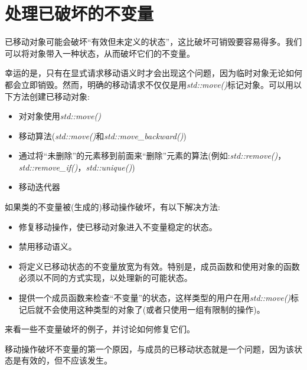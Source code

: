 \section{处理已破坏的不变量}

已移动对象可能会破坏“有效但未定义的状态”，这比破坏可销毁要容易得多。我们可以将对象带入一种状态，从而破坏它们的不变量。\par

幸运的是，只有在显式请求移动语义时才会出现这个问题，因为临时对象无论如何都会立即销毁。然而，明确的移动请求不仅仅是用\textit{std::move()}标记对象。可以用以下方法创建已移动对象:\par

\begin{itemize}
  \item 对对象使用\textit{std::move()}
  \item 移动算法(\textit{std::move()}和\textit{std::\allowbreak{}move\_\allowbreak{}backward(\allowbreak{})\allowbreak{}})
  \item 通过将“未删除”的元素移到前面来“删除”元素的算法(例如:\textit{std::\allowbreak{}remove(\allowbreak{})\allowbreak{}}，\textit{std::\allowbreak{}remove\_\allowbreak{}if(\allowbreak{})\allowbreak{}}，\textit{std::\allowbreak{}unique(\allowbreak{})\allowbreak{}})
  \item 移动迭代器
\end{itemize}

如果类的不变量被(生成的)移动操作破坏，有以下解决方法:\par

\begin{itemize}
  \item 修复移动操作，使已移动对象进入不变量稳定的状态。
  \item 禁用移动语义。
  \item 将定义已移动状态的不变量放宽为有效。特别是，成员函数和使用对象的函数必须以不同的方式实现，以处理新的可能状态。
  \item 提供一个成员函数来检查“不变量”的状态，这样类型的用户在用\textit{std::move()}标记后就不会使用这种类型的对象了(或者只使用一组有限制的操作)。
\end{itemize}

来看一些不变量破坏的例子，并讨论如何修复它们。\par


移动操作破坏不变量的第一个原因，与成员的已移动状态就是一个问题，因为该状态是有效的，但不应该发生。\par

